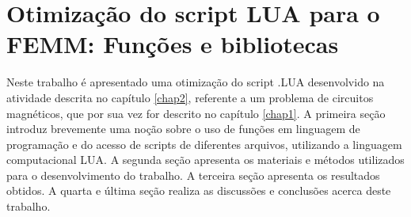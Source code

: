 \chapter{Otimização do script LUA para o FEMM: Funções e bibliotecas}
\label{chap3}
Neste trabalho é apresentado uma otimização do script .LUA desenvolvido na atividade descrita no capítulo \ref{chap2}, referente a um problema de circuitos magnéticos, que por sua vez for descrito no capítulo \ref{chap1}. A primeira seção introduz brevemente uma noção sobre o uso de funções em linguagem de programação e do acesso de scripts de diferentes arquivos, utilizando a linguagem computacional LUA. A segunda seção apresenta os materiais e métodos utilizados para o desenvolvimento do trabalho. A terceira seção apresenta os resultados obtidos. A quarta e última seção realiza as discussões e conclusões acerca deste trabalho.




